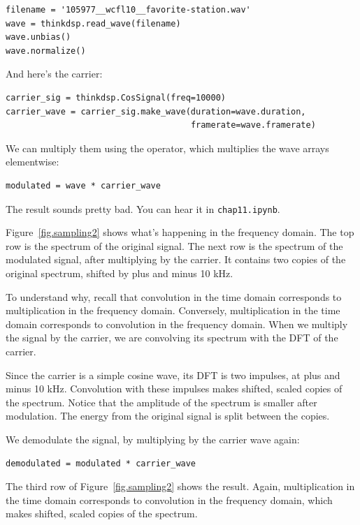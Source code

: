 \documentclass[12pt]{book}
\begin{document}
\begin{verbatim}
filename = '105977__wcfl10__favorite-station.wav'
wave = thinkdsp.read_wave(filename)
wave.unbias()
wave.normalize()
\end{verbatim}

And here's the carrier:

\begin{verbatim}
carrier_sig = thinkdsp.CosSignal(freq=10000)
carrier_wave = carrier_sig.make_wave(duration=wave.duration,
                                     framerate=wave.framerate)
\end{verbatim}

We can multiply them using the {\tt *} operator, which multiplies
the wave arrays elementwise:

\begin{verbatim}
modulated = wave * carrier_wave
\end{verbatim}

The result sounds pretty bad.  You can hear it in {\tt chap11.ipynb}.

Figure~\ref{fig.sampling2} shows what's happening in the frequency
domain.  The top row is the spectrum of the original signal.  The
next row is the spectrum of the modulated signal, after multiplying
by the carrier.  It contains two copies of the original spectrum,
shifted by plus and minus 10 kHz.

To understand why, recall that convolution in the time domain corresponds
to multiplication in the frequency domain.  Conversely, multiplication
in the time domain corresponds to convolution in the frequency domain.
When we multiply the signal by the carrier, we are convolving its
spectrum with the DFT of the carrier.

Since the carrier is a simple cosine wave, its DFT is two impulses, at
plus and minus 10 kHz.  Convolution with these impulses makes
shifted, scaled copies of the spectrum.  Notice that the amplitude of
the spectrum is smaller after modulation.  The energy from the original
signal is split between the copies.

We demodulate the signal, by multiplying by the carrier wave again:

\begin{verbatim}
demodulated = modulated * carrier_wave
\end{verbatim}

The third row of Figure~\ref{fig.sampling2} shows the result.  Again,
multiplication in the time domain corresponds to convolution in the
frequency domain, which makes shifted, scaled copies of the spectrum.
\end{document}
